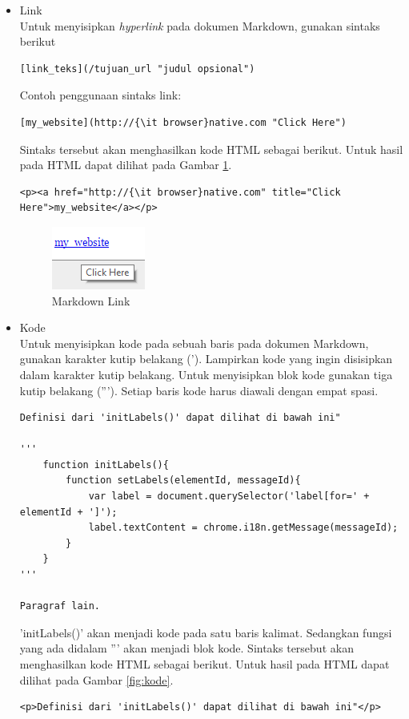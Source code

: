 \begin{itemize}
\begin{itemize}
\begin{itemize}
\item Link\\
Untuk menyisipkan {\it hyperlink} pada dokumen Markdown, gunakan sintaks berikut 
\begin{lstlisting}[basicstyle=\footnotesize]
[link_teks](/tujuan_url "judul opsional")
\end{lstlisting}
Contoh penggunaan sintaks link:
\begin{lstlisting}[basicstyle=\footnotesize]
[my_website](http://{\it browser}native.com "Click Here")
\end{lstlisting}
Sintaks tersebut akan menghasilkan kode HTML sebagai berikut. Untuk
hasil pada HTML dapat dilihat pada Gambar \ref{fig:ml}.
\begin{lstlisting}[basicstyle=\footnotesize]
<p><a href="http://{\it browser}native.com" title="Click Here">my_website</a></p>
\end{lstlisting}
\begin{figure}[H]
\centering
\includegraphics[scale=1]{Gambar/ml.png}
\caption[Markdown Link]{Markdown Link}
\label{fig:ml}
\end{figure}

\item Kode\\
Untuk menyisipkan kode pada sebuah baris pada dokumen Markdown, gunakan karakter
kutip belakang ('). Lampirkan kode yang ingin disisipkan dalam karakter kutip
belakang. Untuk menyisipkan blok kode gunakan tiga kutip belakang ('''). Setiap
baris kode harus diawali dengan empat spasi.
\begin{lstlisting}[basicstyle=\footnotesize]
Definisi dari 'initLabels()' dapat dilihat di bawah ini"

'''
    function initLabels(){
        function setLabels(elementId, messageId){
            var label = document.querySelector('label[for=' + elementId + ']');
            label.textContent = chrome.i18n.getMessage(messageId);
        }
    }
'''

Paragraf lain.
\end{lstlisting}
'initLabels()' akan menjadi kode pada satu baris kalimat. Sedangkan fungsi yang
ada didalam ''' akan menjadi blok kode. Sintaks tersebut akan menghasilkan kode
HTML sebagai berikut. Untuk hasil pada HTML dapat dilihat pada Gambar
\ref{fig:kode}.
\begin{lstlisting}[basicstyle=\footnotesize]
<p>Definisi dari 'initLabels()' dapat dilihat di bawah ini"</p>


\end{lstlisting}
\end{itemize}
\end{itemize}
\end{itemize}
